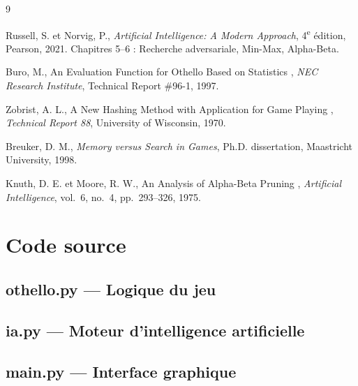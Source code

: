 \documentclass[12pt, a4paper]{article}
\begin{document}
\newpage
\begin{thebibliography}{9}

Russell, S. et Norvig, P.,
\textit{Artificial Intelligence: A Modern Approach},
4\textsuperscript{e} édition, Pearson, 2021.
Chapitres 5--6 : Recherche adversariale, Min-Max, Alpha-Beta.

Buro, M.,
\og An Evaluation Function for Othello Based on Statistics \fg{},
\textit{NEC Research Institute}, Technical Report \#96-1, 1997.

Zobrist, A. L.,
\og A New Hashing Method with Application for Game Playing \fg{},
\textit{Technical Report 88}, University of Wisconsin, 1970.

Breuker, D. M.,
\textit{Memory versus Search in Games},
Ph.D. dissertation, Maastricht University, 1998.

Knuth, D. E. et Moore, R. W.,
\og An Analysis of Alpha-Beta Pruning \fg{},
\textit{Artificial Intelligence}, vol.~6, no.~4, pp.~293--326, 1975.

\end{thebibliography}


\newpage
\appendix
\section{Code source}

\subsection{othello.py — Logique du jeu}

\newpage
\subsection{ia.py — Moteur d'intelligence artificielle}

\newpage
\subsection{main.py — Interface graphique}
\end{document}
